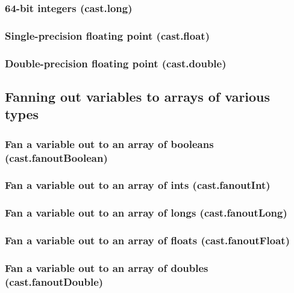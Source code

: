 \documentclass{article}
\theoremstyle{definition}
\begin{document}
\subsubsection{64-bit integers (cast.long)}

\subsubsection{Single-precision floating point (cast.float)}

\subsubsection{Double-precision floating point (cast.double)}

\subsection{Fanning out variables to arrays of various types}

\subsubsection{Fan a variable out to an array of booleans (cast.fanoutBoolean)}

\subsubsection{Fan a variable out to an array of ints (cast.fanoutInt)}

\subsubsection{Fan a variable out to an array of longs (cast.fanoutLong)}

\subsubsection{Fan a variable out to an array of floats (cast.fanoutFloat)}

\subsubsection{Fan a variable out to an array of doubles (cast.fanoutDouble)}
\end{document}
